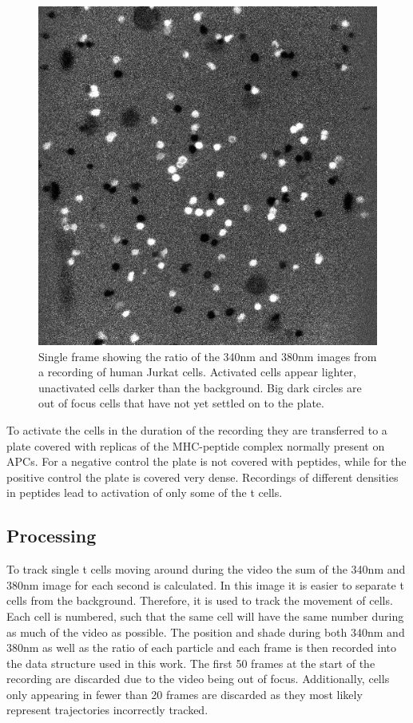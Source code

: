\begin{figure}
	\centering
	\includegraphics[width=0.6\linewidth]{fig/frame_ratio.jpg}
	\caption{Single frame showing the ratio of the 340nm and 380nm images from a recording of human Jurkat cells. Activated cells appear lighter, unactivated cells darker than the background. Big dark circles are out of focus cells that have not yet settled on to the plate.}
	\label{fig:example_ratio_img}
\end{figure}

To activate the cells in the duration of the recording they are transferred to a plate covered with replicas of the MHC-peptide complex normally present on APCs. For a negative control the plate is not covered with peptides, while for the positive control the plate is covered very dense. Recordings of different densities in peptides lead to activation of only some of the t cells.

\subsection{Processing}

To track single t cells moving around during the video the sum of the 340nm and 380nm image for each second is calculated. In this image it is easier to separate t cells from the background. Therefore, it is used to track the movement of cells. Each cell is numbered, such that the same cell will have the same number during as much of the video as possible. The position and shade during both 340nm and 380nm as well as the ratio of each particle and each frame is then recorded into the data structure used in this work. The first 50 frames at the start of the recording are discarded due to the video being out of focus. Additionally, cells only appearing in fewer than 20 frames are discarded as they most likely represent trajectories incorrectly tracked.
